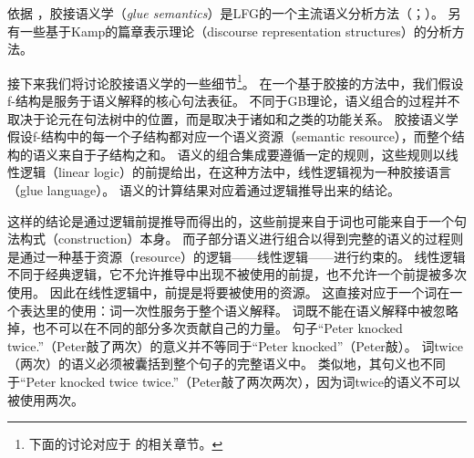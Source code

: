依据 \citet[--92]{Dalrymple2006a}，胶接语义学（\emph{glue semantics}）是LFG的一个主流语义分析方法（\citealp*{DLS93a-u}；\citealp[\S~8]{Dalrymple2001a-u}）。
另有一些基于Kamp的篇章表示理论（discourse representation structures）\citep{KR93a}的分析方法\citep{FR83b,FR83a}。

接下来我们将讨论胶接语义学的一些细节\footnote{%
下面的讨论对应于 的相关章节。
}。
在一个基于胶接的方法中，我们假设f-结构是服务于语义解释的核心句法表征。
不同于GB理论，语义组合的过程并不取决于论元在句法树中的位置，而是取决于诸如\lfgsubj 和\lfgobj 之类的功能关系。 
胶接语义学假设f-结构中的每一个子结构都对应一个语义资源（semantic resource），而整个结构的语义来自于子结构之和。
语义的组合集成要遵循一定的规则，这些规则以线性逻辑（linear logic）的前提给出，在这种方法中，线性逻辑视为一种胶接语言（glue language）。
语义的计算结果对应着通过逻辑推导出来的结论。

这样的结论是通过逻辑前提推导而得出的，这些前提来自于词也可能来自于一个句法构式（construction）本身。
而子部分语义进行组合以得到完整的语义的过程则是通过一种基于资源（resource）的逻辑——线性逻辑——进行约束的。
线性逻辑不同于经典逻辑，它不允许推导中出现不被使用的前提，也不允许一个前提被多次使用。
因此在线性逻辑中，前提是将要被使用的资源。
这直接对应于一个词在一个表达里的使用：词一次性服务于整个语义解释。
词既不能在语义解释中被忽略掉，也不可以在不同的部分多次贡献自己的力量。
句子“Peter knocked twice.”（Peter敲了两次）的意义并不等同于“Peter knocked”（Peter敲）。
词twice（两次）的语义必须被囊括到整个句子的完整语义中。
类似地，其句义也不同于“Peter knocked twice twice.”（Peter敲了两次两次），因为词twice的语义不可以被使用两次。

